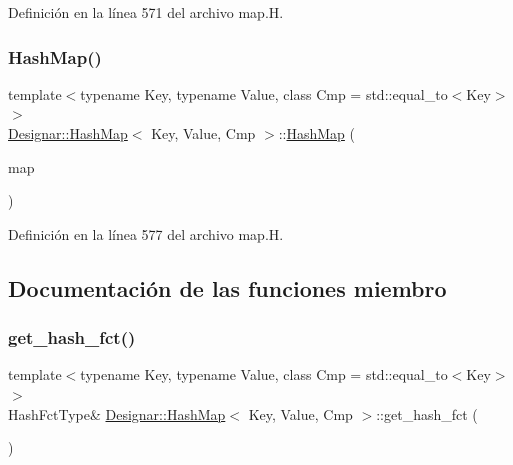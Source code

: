 Definición en la línea 571 del archivo map.\+H.

\mbox{\label{class_designar_1_1_hash_map_a16d4d99bb19bd91ea5700d46d188684b}} 
\subsubsection{\texorpdfstring{Hash\+Map()}{HashMap()}\hspace{0.1cm}{\footnotesize\ttfamily [7/7]}}
{\footnotesize\ttfamily template$<$typename Key, typename Value, class Cmp = std\+::equal\+\_\+to$<$\+Key$>$$>$ \\
\hyperlink{class_designar_1_1_hash_map}{Designar\+::\+Hash\+Map}$<$ Key, Value, Cmp $>$\+::\hyperlink{class_designar_1_1_hash_map}{Hash\+Map} (\begin{DoxyParamCaption}\item[{\hyperlink{class_designar_1_1_hash_map}{Hash\+Map}$<$ Key, Value, Cmp $>$ \&\&}]{map }\end{DoxyParamCaption})\hspace{0.3cm}{\ttfamily [inline]}}



Definición en la línea 577 del archivo map.\+H.



\subsection{Documentación de las funciones miembro}
\mbox{\label{class_designar_1_1_hash_map_abcb9cdbb25c6d35f0f0373011265d570}} 
\subsubsection{\texorpdfstring{get\+\_\+hash\+\_\+fct()}{get\_hash\_fct()}\hspace{0.1cm}{\footnotesize\ttfamily [1/2]}}
{\footnotesize\ttfamily template$<$typename Key, typename Value, class Cmp = std\+::equal\+\_\+to$<$\+Key$>$$>$ \\
Hash\+Fct\+Type\& \hyperlink{class_designar_1_1_hash_map}{Designar\+::\+Hash\+Map}$<$ Key, Value, Cmp $>$\+::get\+\_\+hash\+\_\+fct (\begin{DoxyParamCaption}{ }\end{DoxyParamCaption})\hspace{0.3cm}{\ttfamily [inline]}}



